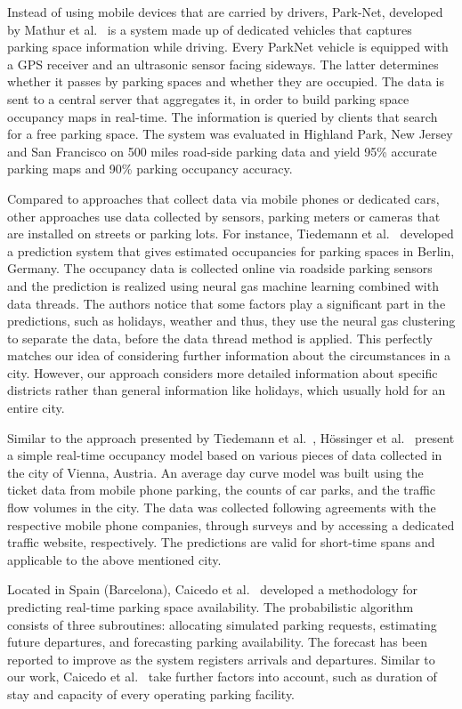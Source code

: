 Instead of using mobile devices that are carried by drivers, Park-Net, developed by Mathur et al.~\cite{mathur} is a system made up of dedicated vehicles that captures parking space information while driving. Every ParkNet vehicle is equipped with a GPS receiver and an ultrasonic sensor facing sideways. The latter determines whether it passes by parking spaces and whether they are occupied. The data is sent to a central server that aggregates it, in order to build parking space occupancy maps in real-time. The information is queried by clients that search for a free parking space. The system was evaluated in Highland Park, New Jersey and San Francisco on 500 miles road-side parking data and yield 95\% accurate parking maps and 90\% parking occupancy accuracy.

Compared to approaches that collect data via mobile phones or dedicated cars, other approaches use data collected by sensors, parking meters or cameras that are installed on streets or parking lots. For instance, Tiedemann et al.~\cite{tiedemann} developed a prediction system that gives estimated occupancies for parking spaces in Berlin, Germany. The occupancy data is collected online via roadside parking sensors and the prediction is realized using neural gas machine learning combined with data threads. The authors notice that some factors play a significant part in the predictions, such as holidays, weather and thus, they use the neural gas clustering to separate the data, before the data thread method is applied. This perfectly matches our idea of considering further information about the circumstances in a city. However, our approach considers more detailed information about specific districts rather than general information like holidays, which usually hold for an entire city. 

Similar to the approach presented by Tiedemann et al.~\cite{tiedemann}, H\"ossinger et al.~\cite{hoessinger} present a simple real-time occupancy model based on various pieces of data collected in the city of Vienna, Austria. An average day curve model was built using the ticket data from mobile phone parking, the counts of car parks, and the traffic flow volumes in the city. The data was collected following agreements with the respective mobile phone companies, through surveys and by accessing a dedicated traffic website, respectively. The predictions are valid for short-time spans and applicable to the above mentioned city.

Located in Spain (Barcelona), Caicedo et al.~\cite{caicedo} developed a methodology for predicting real-time parking space availability. The probabilistic algorithm consists of three subroutines: allocating simulated parking requests, estimating future departures, and forecasting parking availability. The forecast has been reported to improve as the system registers arrivals and departures. Similar to our work, Caicedo et al.~\cite{caicedo} take further factors into account, such as duration of stay and capacity of every operating parking facility.


